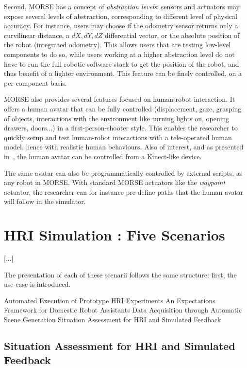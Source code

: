 \documentclass[conference]{IEEEtran}
\begin{document}
Second, MORSE has a concept of \emph{abstraction levels}: sensors and actuators may
expose several levels of abstraction, corresponding to different level of
physical accuracy. For instance, users may choose if the odometry sensor returns
only a curvilinear distance, a $dX, dY, dZ$ differential vector, or the absolute
position of the robot (integrated odometry). This allows users that are testing
low-level components to do so, while users working at a higher abstraction level
do not have to run the full robotic software stack to get the position of the
robot, and thus benefit of a lighter environment. This feature can be finely
controlled, on a per-component basis.

MORSE also provides several features focused on human-robot interaction. It
offers a human avatar that can be fully controlled (displacement, gaze, grasping
of objects, interactions with the environment like turning lights on, opening
drawers, doors...) in a first-person-shooter style. This enables the researcher
to quickly setup and test human-robot interactions with a tele-operated human
model, hence with realistic human behaviours. Also of interest, and as presented
in~\cite{lemaignan2012morse}, the human avatar can be controlled from a
Kinect-like device.

The same avatar can also be programmatically controlled by external scripts, as
any robot in MORSE. With standard MORSE actuators like the \emph{waypoint} actuator,
the researcher can for instance pre-define paths that the human avatar will
follow in the simulator.



\section{HRI Simulation : Five Scenarios}

[...]

The presentation of each of these scenarii follows the same structure: first,
the use-case is introduced.


Automated Execution of Prototype HRI Experiments
An Expectations Framework for Domestic Robot Assistants
Data Acquisition through Automatic Scene Generation
Situation Assessment for HRI and Simulated Feedback

\subsection{Situation Assessment for HRI and Simulated Feedback}
\label{sc:assessment}
\end{document}
